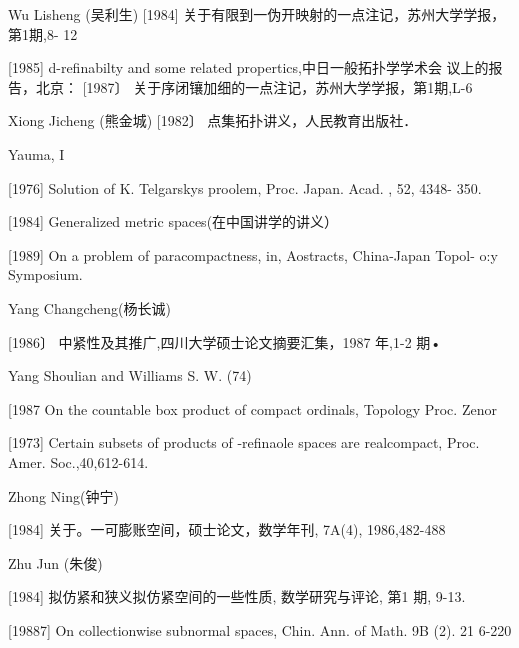 \documentclass[main.tex]{subfiles}
\begin{document}
\noindent Wu Lisheng (吴利生)
	[1984]
	关于有限到一伪开映射的一点注记，苏州大学学报，第1期,8-
	12
	
[1985] d-refinabilty and some related propertics,中日一般拓扑学学术会
议上的报告，北京：
[1987〕 关于序闭镶加细的一点注记，苏州大学学报，第1期,L-6

\noindent Xiong Jicheng (熊金城)
[1982〕 点集拓扑讲义，人民教育出版社．

\noindent Yauma, I

[1976]
Solution of K. Telgarskys proolem, Proc. Japan. Acad. , 52, 4348-
350.

[1984]
Generalized metric spaces(在中国讲学的讲义）

[1989]
On a problem of paracompactness, in, Aostracts, China-Japan Topol-
o:y Symposium.

\noindent Yang Changcheng(杨长诚)

[1986〕 中紧性及其推广,四川大学硕士论文摘要汇集，1987 年,1-2
期•

\noindent Yang Shoulian and Williams S. W. (74)

[1987 On the countable box product of compact ordinals, Topology Proc.
Zenor

[1973]
Certain subsets of products of -refinaole spaces are realcompact,
Proc. Amer. Soc.,40,612-614.

\noindent Zhong Ning(钟宁)

[1984] 关于。一可膨账空间，硕士论文，数学年刊, 7A(4), 1986,482-488

\noindent Zhu Jun (朱俊)

[1984] 拟仿紧和狭义拟仿紧空间的一些性质, 数学研究与评论, 第1
期, 9-13.

[19887]
On collectionwise subnormal spaces, Chin. Ann. of Math. 9B (2).
21 6-220


	
\end{document}
